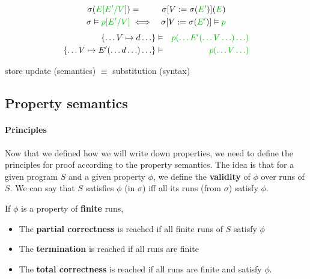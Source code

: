 \documentclass[12pt, a4paper]{book}
\begin{document}
\begin{eqnarray*}
    \sigma(\textcolor{green!70!black}{E[E'/V}]) & = & \sigma[V:=\sigma(\textcolor{green!70!black}{E'})](\textcolor{green!70!black}{E}) \\
    \sigma \vDash \textcolor{green!70!black}{p[E'/V]} & \iff & \sigma[V:=\sigma(\textcolor{green!70!black}{E'})] \vDash \textcolor{green!70!black}{p}
\end{eqnarray*}
\begin{eqnarray*}
    \{\ldots V \mapsto d \ldots\} & \vDash & \textcolor{green!70!black}{p(\ldots E'(\ldots V \ldots) \ldots)} \\
    \{\ldots V \mapsto E' (\ldots d\ldots) \ldots\} & \vDash & \textcolor{green!70!black}{p(\ldots V\ldots)}
\end{eqnarray*}

store update (semantics) $\equiv$ \textcolor{green!70!black}{substitution (syntax)}

\subsection{Property semantics}
\label{sub:Property semantics}

\paragraph{Principles} Now that we defined how we will write down properties, we
need to define the principles for proof according to the property semantics. The
idea is that for a given program $S$ and a given property $\phi$, we define
the \textbf{validity} of $\phi$ over runs of $S$. We can say that $S$ satisfies
$\phi$ (in $\sigma$) iff all its runs (from $\sigma$) satisfy $\phi$. \newline

If $\phi$ is a property of \textbf{finite} runs,

\begin{itemize}
    \item The \textbf{partial correctness} is reached if all finite runs of $S$
    satisfy $\phi$
    \item The \textbf{termination} is reached if all runs are finite
    \item The \textbf{total correctness} is reached if all runs are finite and
    satisfy $\phi$.
\end{itemize}
\end{document}
